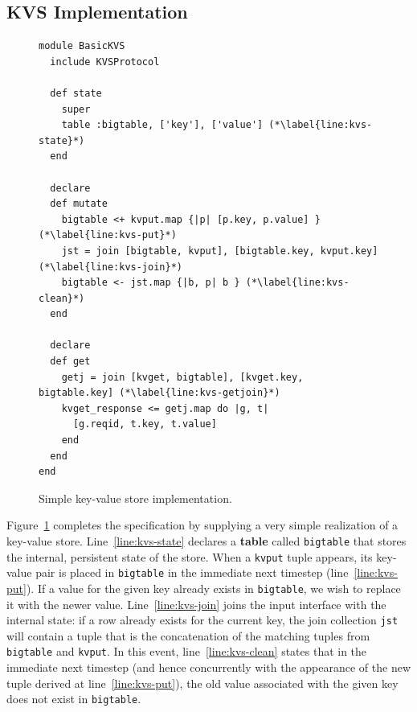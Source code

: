 \subsection{KVS Implementation}
\begin{figure}[t]
\begin{scriptsize}
\begin{lstlisting}
module BasicKVS
  include KVSProtocol

  def state
    super
    table :bigtable, ['key'], ['value'] (*\label{line:kvs-state}*)
  end

  declare
  def mutate
    bigtable <+ kvput.map {|p| [p.key, p.value] } (*\label{line:kvs-put}*)
    jst = join [bigtable, kvput], [bigtable.key, kvput.key] (*\label{line:kvs-join}*)
    bigtable <- jst.map {|b, p| b } (*\label{line:kvs-clean}*)
  end

  declare
  def get
    getj = join [kvget, bigtable], [kvget.key, bigtable.key] (*\label{line:kvs-getjoin}*)
    kvget_response <= getj.map do |g, t|
      [g.reqid, t.key, t.value]
    end
  end
end
\end{lstlisting}
\centering
\vspace{-10pt}
\caption{Simple key-value store implementation.}
\label{fig:kvs-impl}
\end{scriptsize}
\vspace{-2pt}
\end{figure}

Figure~\ref{fig:kvs-impl} completes the specification by supplying a very simple
realization of a key-value store.  Line~\ref{line:kvs-state} declares a \textbf{table}
called \texttt{bigtable} that stores the internal, persistent state of the store.
When a \texttt{kvput} tuple appears, its key-value pair is placed in \texttt{bigtable} in the
immediate next timestep (line~\ref{line:kvs-put}).  If a value for the given key already 
exists in \texttt{bigtable}, we wish to replace it with the newer value.  Line~\ref{line:kvs-join}
joins the input interface with the internal state: if a row already exists for the current key,  
the join collection \texttt{jst} will contain a tuple that is the concatenation of the matching
tuples from \texttt{bigtable} and \texttt{kvput}.  In this event, line~\ref{line:kvs-clean}
states that in the immediate next timestep (and hence concurrently with the appearance of the
new tuple derived at line~\ref{line:kvs-put}), the old value associated with the given key
does not exist in \texttt{bigtable}.  



